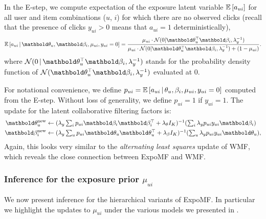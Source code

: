 In the E-step, we compute expectation of the exposure latent variable $\mathbb{E}\left[a_{ui}\right]$ for all user and item combinations ($u$, $i$) for which there are no observed clicks (recall that the presence of clicks $y_{ui}>0$ means that $a_{ui}=1$ deterministically),
\begin{equation}
\E{a_{ui} \g \mb\theta_u, \mb\beta_i, \mu_{ui}, y_{ui} = 0} = \frac{\mu_{ui} \cdot \mathcal{N}(0 | \mb\theta_u^\top\mb\beta_i, \lambda_y^{-1})}{\mu_{ui}\cdot \mathcal{N}(0 |  \mb\theta_u^\top \mb\beta_i, \lambda_y^{-1}) + (1 - \mu_{ui})}.
\label{eq:update_a}
\end{equation}
where $\mathcal{N}(0 \g \mb\theta_u^\top\mb\beta_i, \lambda_y^{-1})$ stands for the probability density function of $\mathcal{N}(\mb\theta_u^\top\mb\beta_i, \lambda_y^{-1})$ evaluated at $0$. 

For notational convenience, we define $p_{ui} = \mathbb{E}\left[a_{ui} \,\vert\, \theta_u, \beta_i, \mu_{ui}, y_{ui} = 0\right]$ computed from the E-step. Without loss of generality, we define $p_{ui} = 1$ if $y_{ui} = 1$. The update for the latent collaborative filtering factors is:
\begin{align}
\mb\theta_u^\new &\leftarrow \textstyle(\lambda_y \sum_i p_{ui} \mb\beta_i \mb\beta_i^\top +  \lambda_\theta I_K)^{-1} (\sum_i \lambda_y p_{ui} y_{ui} \mb\beta_i ) \label{eq:update_theta}\\
\mb\beta_i^\new &\leftarrow \textstyle(\lambda_y \sum_u p_{ui} \mb\theta_u \mb\theta_u^\top + \lambda_\beta I_K)^{-1} (\sum_u \lambda_y p_{ui} {y}_{ui} \mb\theta_u), \label{eq:update_beta}
\end{align}
Again, this looks very similar to the \textit{alternating least squares} update of \gls{WMF}, which reveals the close connection between ExpoMF and \gls{WMF}.

\subsubsection{Inference for the exposure prior $\mu_{ui}$}
\label{sec:inf_hier_model}
We now present inference for the hierarchical variants of ExpoMF. 
In particular we highlight the updates to 
$\mu_{ui}$ under the various models we presented in .

